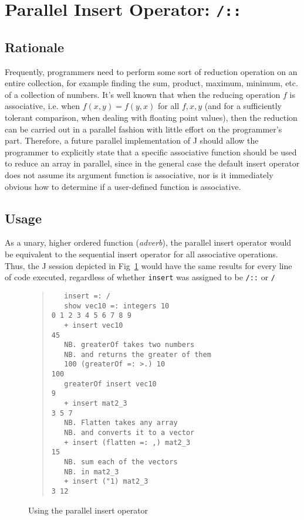 \pagebreak

\section{Parallel Insert Operator: \texttt{/::}}
\label{pins}
\subsection{Rationale}
Frequently, programmers need to perform some sort of reduction operation on an entire collection, 
for example finding the sum, product, maximum, minimum, etc. of a collection of numbers.
It's well known that when the reducing operation $f$ is associative, 
i.e. when $f(x,y) = f(y,x)$ for all $f, x, y$ (and for a sufficiently tolerant comparison, when dealing with floating point values),
then the reduction can be carried out in a parallel fashion with little effort on the programmer's part.
Therefore, a future parallel implementation of J should allow the programmer 
to explicitly state that a specific associative function should be used to reduce an array in parallel, 
since in the general case the default insert operator does not assume its argument function is associative, 
nor is it immediately obvious how to determine if a user-defined function is associative.

\subsection{Usage}
As a unary, higher ordered function (\textit{adverb}), 
the parallel insert operator would be equivalent to the sequential insert operator 
for all associative operations. 
Thus, the J session depicted in Fig~\ref{fig::pinsert} would have the same results for every line of code executed, 
regardless of whether \texttt{insert} was assigned to be \texttt{/::} or \texttt{/}

\begin{figure}[h]
\begin{quote}
\begin{singlespacing}
\begin{small}
\begin{verbatim}
   insert =: /
   show vec10 =: integers 10
0 1 2 3 4 5 6 7 8 9
   + insert vec10
45
   NB. greaterOf takes two numbers
   NB. and returns the greater of them
   100 (greaterOf =: >.) 10
100
   greaterOf insert vec10
9
   + insert mat2_3
3 5 7
   NB. Flatten takes any array
   NB. and converts it to a vector
   + insert (flatten =: ,) mat2_3
15
   NB. sum each of the vectors
   NB. in mat2_3
   + insert ("1) mat2_3
3 12
\end{verbatim}
\end{small}
\end{singlespacing}
\end{quote}
\caption{Using the parallel insert operator}
\label{fig::pinsert}
\end{figure}

